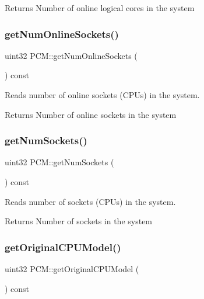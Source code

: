 \begin{DoxyReturn}{Returns}
Number of online logical cores in the system 
\end{DoxyReturn}
\mbox{\label{class_p_c_m_a9b3c25455743ff4475b237d7c338d4a2}} 
\subsubsection{\texorpdfstring{get\+Num\+Online\+Sockets()}{getNumOnlineSockets()}}
{\footnotesize\ttfamily uint32 P\+C\+M\+::get\+Num\+Online\+Sockets (\begin{DoxyParamCaption}{ }\end{DoxyParamCaption}) const}



Reads number of online sockets (C\+P\+Us) in the system. 

\begin{DoxyReturn}{Returns}
Number of online sockets in the system 
\end{DoxyReturn}
\mbox{\label{class_p_c_m_a7d4964e57e7692b5cc67d8b5056e5299}} 
\subsubsection{\texorpdfstring{get\+Num\+Sockets()}{getNumSockets()}}
{\footnotesize\ttfamily uint32 P\+C\+M\+::get\+Num\+Sockets (\begin{DoxyParamCaption}{ }\end{DoxyParamCaption}) const}



Reads number of sockets (C\+P\+Us) in the system. 

\begin{DoxyReturn}{Returns}
Number of sockets in the system 
\end{DoxyReturn}
\mbox{\label{class_p_c_m_ade53fbb558df9f80eac56435f2bd0e55}} 
\subsubsection{\texorpdfstring{get\+Original\+C\+P\+U\+Model()}{getOriginalCPUModel()}}
{\footnotesize\ttfamily uint32 P\+C\+M\+::get\+Original\+C\+P\+U\+Model (\begin{DoxyParamCaption}{ }\end{DoxyParamCaption}) const\hspace{0.3cm}{\ttfamily [inline]}}



